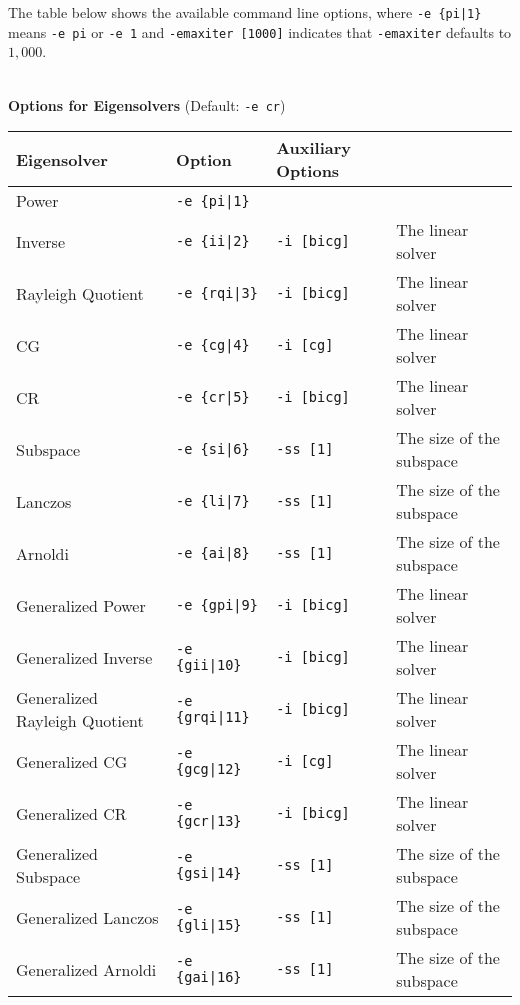 \documentclass[a4paper]{article}
\begin{document}
The table below shows the available command line options, 
where \verb=-e {pi|1}= means \verb=-e pi= or \verb=-e 1= and \verb=-emaxiter [1000]= indicates 
that \verb=-emaxiter= defaults to $1,000$.
\\
\\
\begin{minipage}[t]{\textwidth}
\begin{center}
{\bf Options for Eigensolvers} (Default: \verb=-e cr=) \\
\begin{tabular}{l|lll}\hline\hline
 Eigensolver      & Option              &  Auxiliary Options  & \\ \hline
\hline
 Power                             & \verb=-e {pi|1}=        &    \\ 
 Inverse                           & \verb=-e {ii|2}=        & 
 \verb=-i [bicg]= & The linear solver \\
 Rayleigh Quotient                 & \verb=-e {rqi|3}=       &
 \verb=-i [bicg]= & The linear solver \\
 CG                                & \verb=-e {cg|4}=        &
 \verb=-i [cg]= & The linear solver \\ 
 CR                                & \verb=-e {cr|5}=        &
 \verb=-i [bicg]= & The linear solver \\ 
 Subspace                          & \verb=-e {si|6}=        &
 \verb=-ss [1]= & The size of the subspace \\
 Lanczos                           & \verb=-e {li|7}=        &
 \verb=-ss [1]= & The size of the subspace \\
 Arnoldi                           & \verb=-e {ai|8}=        &
 \verb=-ss [1]= & The size of the subspace \\
 Generalized Power                 & \verb=-e {gpi|9}=      &
 \verb=-i [bicg]= & The linear solver \\ 
 Generalized Inverse               & \verb=-e {gii|10}=      & 
 \verb=-i [bicg]= & The linear solver \\
 Generalized Rayleigh Quotient     & \verb=-e {grqi|11}=      & 
 \verb=-i [bicg]= & The linear solver \\ 
 Generalized CG                    & \verb=-e {gcg|12}=      & 
 \verb=-i [cg]= & The linear solver \\
 Generalized CR                    & \verb=-e {gcr|13}=      & 
 \verb=-i [bicg]= & The linear solver \\
 Generalized Subspace              & \verb=-e {gsi|14}=      &
 \verb=-ss [1]= & The size of the subspace \\
 Generalized Lanczos               & \verb=-e {gli|15}=      &
 \verb=-ss [1]= & The size of the subspace \\
 Generalized Arnoldi               & \verb=-e {gai|16}=      &
 \verb=-ss [1]= & The size of the subspace \\  
\hline         
\end{tabular}
\end{center}
\end{minipage}
\end{document}

